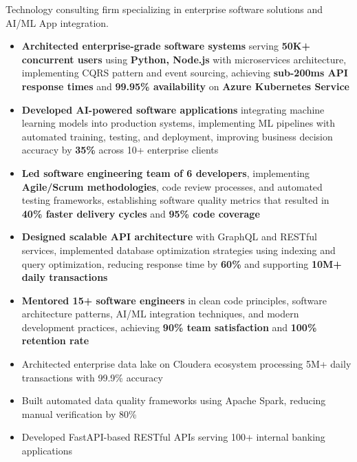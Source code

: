 \documentclass[10pt,a4paper,ragged2e,withhyper]{altacv}
\begin{document}
\begin{minipage}{\linewidth}
\justifying
Technology consulting firm specializing in enterprise software solutions and AI/ML App integration.
\end{minipage}

\medskip

\begin{itemize}
    \item \textbf{Architected enterprise-grade software systems} serving \textbf{50K+ concurrent users} using \textbf{Python, Node.js} with microservices architecture, implementing CQRS pattern and event sourcing, achieving \textbf{sub-200ms API response times} and \textbf{99.95\% availability} on \textbf{Azure Kubernetes Service}
    
    \item \textbf{Developed AI-powered software applications} integrating machine learning models into production systems, implementing ML pipelines with automated training, testing, and deployment, improving business decision accuracy by \textbf{35\%} across 10+ enterprise clients
    
    \item \textbf{Led software engineering team of 6 developers}, implementing \textbf{Agile/Scrum methodologies}, code review processes, and automated testing frameworks, establishing software quality metrics that resulted in \textbf{40\% faster delivery cycles} and \textbf{95\% code coverage}
    
    \item \textbf{Designed scalable API architecture} with GraphQL and RESTful services, implemented database optimization strategies using indexing and query optimization, reducing response time by \textbf{60\%} and supporting \textbf{10M+ daily transactions}
    
    \item \textbf{Mentored 15+ software engineers} in clean code principles, software architecture patterns, AI/ML integration techniques, and modern development practices, achieving \textbf{90\% team satisfaction} and \textbf{100\% retention rate}
\end{itemize}


\begin{itemize}[leftmargin=*,noitemsep,topsep=0pt]
    \item Architected enterprise data lake on Cloudera ecosystem processing 5M+ daily transactions with 99.9\% accuracy
    \item Built automated data quality frameworks using Apache Spark, reducing manual verification by 80\%
    \item Developed FastAPI-based RESTful APIs serving 100+ internal banking applications
\end{itemize}
\end{document}
